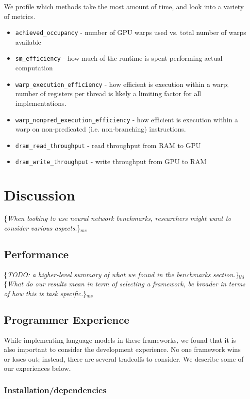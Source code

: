 \documentclass{article}
\newcommand{\ms}[1]{{\color{cyan}\{\textit{#1}\}$_{ms}$}}
\newcommand{\lhl}[1]{{\color{magenta}\{\textit{#1}\}$_{lhl}$}}
\begin{document}
We profile which methods take the most amount of time, and look into a variety of metrics.
\begin{itemize}
\item \verb!achieved_occupancy! - number of GPU warps used vs. total number of warps available
\item \verb!sm_efficiency! - how much of the runtime is spent performing actual computation
\item \verb!warp_execution_efficiency! - how efficient is execution within a warp; number of registers per thread is likely a limiting factor for all implementations.
\item \verb!warp_nonpred_execution_efficiency! - how efficient is execution within a warp on non-predicated (i.e. non-branching) instructions.
\item \verb!dram_read_throughput! - read throughput from RAM to GPU
\item \verb!dram_write_throughput! - write throughput from GPU to RAM
\end{itemize}

\section{Discussion}
\ms{When looking to use neural network benchmarks, researchers might want to consider various aspects.}

\subsection{Performance}

\lhl{TODO: a higher-level summary of what we found in the benchmarks section.}
\ms{What do our results mean in term of selecting a framework, be broader in terms of how this is task specific.}

\subsection{Programmer Experience}

While implementing language models in these frameworks, we found that it is also important to consider the development experience. No one framework wins or loses out; instead, there are several tradeoffs to consider. We describe some of our experiences below.

\subsubsection{Installation/dependencies}
\end{document}

